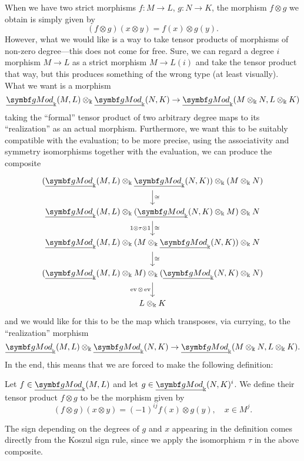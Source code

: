 When we have two strict morphisms \(f\!:M \to L\), \(g\!:N\to K\), the morphism \(f\otimes g\) we obtain is simply given by
\[ (f\otimes g)(x\otimes y) = f(x)\otimes g(y). \]
However, what we would like is a way to take tensor products of morphisms of non-zero degree---this does not come for free. Sure, we can
regard a degree \(i\) morphism \(M \to L\) as a strict morphism \(M \to L(i)\) and take the tensor product that way, but this produces something
of the wrong type (at least visually). What we want is a morphism
\[ \ugMod_\Bbbk(M,L) \otimes_\Bbbk \ugMod_\Bbbk(N,K) \to \ugMod_\Bbbk(M\otimes_\Bbbk N, L\otimes_\Bbbk K) \]
taking the ``formal'' tensor product of two arbitrary degree maps to its ``realization'' as an actual morphism. Furthermore, we want this
to be suitably compatible with the evaluation; to be more precise, using the associativity and symmetry isomorphisms together with the evaluation, we can produce
the composite
\[
	\begin{tikzcd}
		(\ugMod_\Bbbk(M,L) \otimes_\Bbbk \ugMod_\Bbbk(N,K))\otimes_\Bbbk (M\otimes_\Bbbk N) \ar[d,"\cong"] \\
		\ugMod_\Bbbk(M,L) \otimes_\Bbbk (\ugMod_\Bbbk(N,K) \otimes_\Bbbk M) \otimes_\Bbbk N \ar[d,"1\otimes\tau\otimes 1"',"\cong"] \\
		\ugMod_\Bbbk(M,L) \otimes_\Bbbk ( M\otimes_\Bbbk \ugMod_\Bbbk(N,K)) \otimes_\Bbbk N \ar[d,"\cong"] \\
		(\ugMod_\Bbbk(M,L) \otimes_\Bbbk M) \otimes_\Bbbk (\ugMod_\Bbbk(N,K) \otimes_\Bbbk N)\ar[d,"\ev\otimes\ev"'] \\
		L\otimes_\Bbbk K
	\end{tikzcd}
\]
and we would like for this to be the map which transposes, via currying, to the ``realization'' morphism
\[ \ugMod_\Bbbk(M,L) \otimes_\Bbbk \ugMod_\Bbbk(N,K) \to \ugMod_\Bbbk(M\otimes_\Bbbk N, L\otimes_\Bbbk K). \]
In the end, this means that we are forced to make the following definition:
\begin{definition}
	Let \(f\in\ugMod_\Bbbk(M,L)\) and let \(g\in\ugMod_\Bbbk(N,K)^i\). We define their tensor product \(f\otimes g\) to be the morphism given by
	\[ (f\otimes g)(x\otimes y) = (-1)^{ij}f(x)\otimes g(y),\quad x\in M^j. \]
\end{definition}
\begin{remark}
	The sign depending on the degrees of \(g\) and \(x\) appearing in the definition comes directly from the Koszul sign rule, since we apply the isomorphism \(\tau\)
	in the above composite.
\end{remark}

